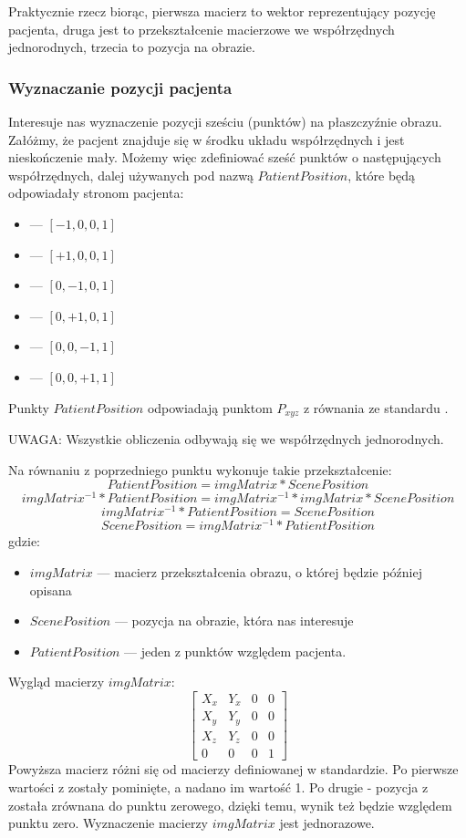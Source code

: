 Praktycznie rzecz biorąc, pierwsza macierz to wektor reprezentujący pozycję pacjenta, druga jest to przekształcenie macierzowe we współrzędnych jednorodnych, trzecia to pozycja na obrazie.

\subsubsection{Wyznaczanie pozycji pacjenta}

Interesuje nas wyznaczenie pozycji sześciu (punktów) na płaszczyźnie obrazu.
Załóżmy, że pacjent znajduje się w środku układu współrzędnych i jest nieskończenie mały.
Możemy więc zdefiniować sześć punktów o następujących współrzędnych, dalej używanych pod nazwą $PatientPosition$, które będą odpowiadały stronom pacjenta:
\begin{itemize}
    \item {} --- $[-1, 0, 0, 1]$
    \item {} --- $[+1, 0, 0, 1]$
    \item {} --- $[0, -1, 0, 1]$
    \item {} --- $[0, +1, 0, 1]$
    \item {} --- $[0, 0, -1, 1]$
    \item {} --- $[0, 0, +1, 1]$
\end{itemize}
Punkty $PatientPosition$ odpowiadają punktom $P_{xyz}$ z równania ze standardu \DICOM.

\par
UWAGA: Wszystkie obliczenia odbywają się we współrzędnych jednorodnych.

\par
Na równaniu z poprzedniego punktu wykonuje takie przekształcenie:
\[PatientPosition = imgMatrix * ScenePosition\]
\[imgMatrix^{-1} * PatientPosition = imgMatrix^{-1} * imgMatrix * ScenePosition\]
\[imgMatrix^{-1} * PatientPosition = ScenePosition\]
\[ScenePosition = imgMatrix^{-1} * PatientPosition\]
gdzie:
\begin{itemize}
    \item $imgMatrix$ --- macierz przekształcenia obrazu, o której będzie później opisana
    \item $ScenePosition$ --- pozycja na obrazie, która nas interesuje
    \item $PatientPosition$ --- jeden z punktów względem pacjenta.
\end{itemize}
\par
Wygląd macierzy $imgMatrix$:
\[
    \begin{bmatrix}
        X_x & Y_x & 0 & 0 \\
        X_y & Y_y & 0 & 0 \\
        X_z & Y_z & 0 & 0 \\
        0   & 0   & 0 & 1
    \end{bmatrix}
\]
Powyższa macierz różni się od macierzy definiowanej w standardzie.
Po pierwsze wartości z  zostały pominięte, a nadano im wartość 1.
Po drugie - pozycja z  została zrównana do punktu zerowego, dzięki temu, wynik też będzie względem punktu zero.
Wyznaczenie macierzy $imgMatrix$ jest jednorazowe.

